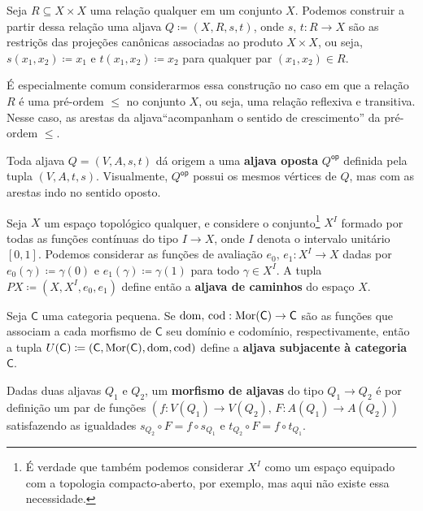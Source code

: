 \begin{exem}\label{exem:aljava_via_relacao}
    Seja $R \subseteq X \times X$ uma relação qualquer em um conjunto $X$.
    Podemos construir a partir dessa relação uma aljava $Q \coloneqq (X,R,s,t)$, onde $s,\,t: R \to X$ são as restriçõs das projeções canônicas associadas ao produto $X \times X$, ou seja, $s(x_1,x_2) \coloneqq x_1$ e $t(x_1,x_2) \coloneqq x_2$ para qualquer par $(x_1,x_2) \in R$.
    
    É especialmente comum considerarmos essa construção no caso em que a relação $R$ é uma pré-ordem $\leq$ no conjunto $X$, ou seja, uma relação reflexiva e transitiva.
    Nesse caso, as arestas da aljava``acompanham o sentido de crescimento'' da pré-ordem $\leq$.
\end{exem}

\begin{exem}\label{exem:aljava_oposta}
    Toda aljava $Q=(V,A,s,t)$ dá origem a uma \textbf{aljava oposta} $Q^{\mathsf{op}}$ definida pela tupla $(V,A,t,s)$.
    Visualmente, $Q^{\mathsf{op}}$ possui os mesmos vértices de $Q$, mas com as arestas indo no sentido oposto.
\end{exem}

\begin{exem}\label{exem:aljava_via_espaco}
    Seja $X$ um espaço topológico qualquer, e considere o conjunto\footnote{É verdade que também podemos considerar $X^I$ como um espaço equipado com a topologia compacto-aberto, por exemplo, mas aqui não existe essa necessidade.} $X^I$ formado por todas as funções contínuas do tipo $I \to X$, onde $I$ denota o intervalo unitário $[0,1]$.
    Podemos considerar as funções de avaliação $e_0,\, e_1: X^I \to X$ dadas por $e_0(\gamma) \coloneqq \gamma(0)$ e $e_1(\gamma) \coloneqq \gamma(1)$ para todo $\gamma \in X^{I}$.
    A tupla $PX \coloneqq (X,X^I,e_0,e_1)$ define então a \textbf{aljava de caminhos} do espaço $X$.
\end{exem}

\begin{exem}\label{exem:aljava_subjacente_categoria}
    Seja $\mathsf{C}$ uma categoria pequena.
    Se $\mathrm{dom},\,\mathrm{cod}: \mathrm{Mor}(\mathsf{C}) \to \mathsf{C}$ são as funções que associam a cada morfismo de $\mathsf{C}$ seu domínio e codomínio, respectivamente, então a tupla $U(\mathsf{C}) \coloneqq (\mathsf{C},\mathrm{Mor}(\mathsf{C}),\mathrm{dom},\mathrm{cod})$ define a \textbf{aljava subjacente à categoria} $\mathsf{C}$.
\end{exem}

\begin{defin}\label{defin:morfismo_aljavas}
    Dadas duas aljavas $Q_1$ e $Q_2$, um \textbf{morfismo de aljavas} do tipo $Q_1 \to Q_2$ é por definição um par de funções $(f: V(Q_1) \to V(Q_2),\, F: A(Q_1) \to A(Q_2))$ satisfazendo as igualdades $s_{Q_2} \circ F = f \circ s_{Q_1}$ e $t_{Q_2} \circ F = f \circ t_{Q_1}$.
\end{defin}

